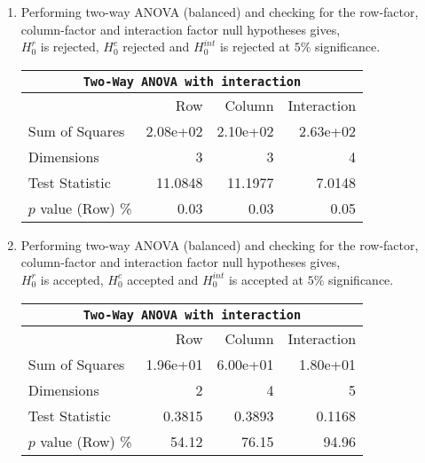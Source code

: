 \begin{enumerate}
\begin{table}[H]
		\bigskip
	\end{table}

	\item Performing two-way ANOVA (balanced) and checking for the row-factor, column-factor and interaction factor null hypotheses gives,\\
	$ H_0^r $ is rejected, $ H_0^c $ rejected and $ H_0^{int} $ is rejected at $ 5\% $ significance.\\
	
	\begin{table}[H]
		\centering
		\begin{tabular}{@{}lrrr@{}}
			\toprule
			\multicolumn{4}{c}{\texttt{Two-Way ANOVA with interaction}}\\ 
			\midrule
			{} &       Row &    Column & Interaction \\
			\midrule
			Sum of Squares     &  2.08e+02 &  2.10e+02 &    2.63e+02 \\
			Dimensions         &         3 &         3 &           4 \\
			Test Statistic     &   11.0848 &   11.1977 &      7.0148 \\
			$p$ value (Row) \% &      0.03 &      0.03 &        0.05 \\
			\bottomrule
		\end{tabular}
		
		\bigskip
	\end{table}
	
	\item Performing two-way ANOVA (balanced) and checking for the row-factor, column-factor and interaction factor null hypotheses gives,\\
	$ H_0^r $ is accepted, $ H_0^c $ accepted and $ H_0^{int} $ is accepted at $ 5\% $ significance.\\
	
	\begin{table}[H]
		\centering
		\begin{tabular}{@{}lrrr@{}}
			\toprule
			\multicolumn{4}{c}{\texttt{Two-Way ANOVA with interaction}}\\ 
			\midrule
			{} &       Row &    Column & Interaction \\
			\midrule
			Sum of Squares     &  1.96e+01 &  6.00e+01 &    1.80e+01 \\
			Dimensions         &         2 &         4 &           5 \\
			Test Statistic     &    0.3815 &    0.3893 &      0.1168 \\
			$p$ value (Row) \% &     54.12 &     76.15 &       94.96 \\
			\bottomrule
		\end{tabular}
		

\end{table}
\end{enumerate}
